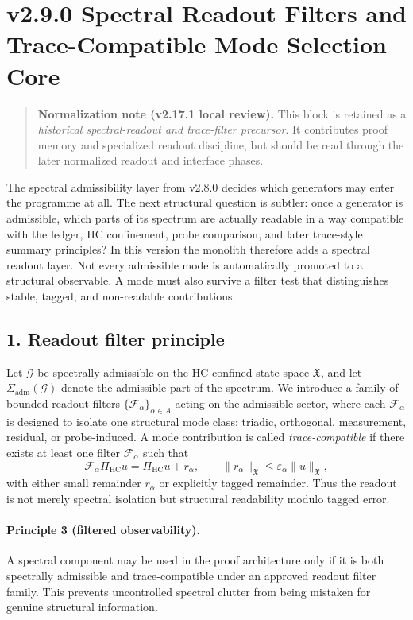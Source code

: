 \section*{v2.9.0 Spectral Readout Filters and Trace-Compatible Mode Selection Core}

\begin{quote}
\textbf{Normalization note (v2.17.1 local review).}
This block is retained as a \emph{historical spectral-readout and trace-filter precursor}. It contributes proof memory and specialized readout discipline, but should be read through the later normalized readout and interface phases.
\end{quote}

The spectral admissibility layer from v2.8.0 decides which generators may enter the
programme at all. The next structural question is subtler: once a generator is
admissible, which parts of its spectrum are actually readable in a way compatible
with the ledger, HC confinement, probe comparison, and later trace-style summary
principles? In this version the monolith therefore adds a spectral readout layer.
Not every admissible mode is automatically promoted to a structural observable. A
mode must also survive a filter test that distinguishes stable, tagged, and
non-readable contributions.

\subsection*{1. Readout filter principle}
Let $\mathcal G$ be spectrally admissible on the HC-confined state space
$\mathfrak X$, and let $\Sigma_{\mathrm{adm}}(\mathcal G)$ denote the admissible part
of the spectrum. We introduce a family of bounded readout filters
$\{\mathcal F_\alpha\}_{\alpha\in A}$ acting on the admissible sector, where each
$\mathcal F_\alpha$ is designed to isolate one structural mode class: triadic,
orthogonal, measurement, residual, or probe-induced. A mode contribution is called
\emph{trace-compatible} if there exists at least one filter $\mathcal F_\alpha$ such
that
\[
\mathcal F_\alpha \Pi_{\mathrm{HC}} u = \Pi_{\mathrm{HC}} u + r_\alpha,
\qquad
\|r_\alpha\|_{\mathfrak X} \le \varepsilon_\alpha \|u\|_{\mathfrak X},
\]
with either small remainder $r_\alpha$ or explicitly tagged remainder. Thus the
readout is not merely spectral isolation but structural readability modulo tagged
error.

\paragraph{Principle 3 (filtered observability).}
A spectral component may be used in the proof architecture only if it is both
spectrally admissible and trace-compatible under an approved readout filter family.
This prevents uncontrolled spectral clutter from being mistaken for genuine
structural information.

